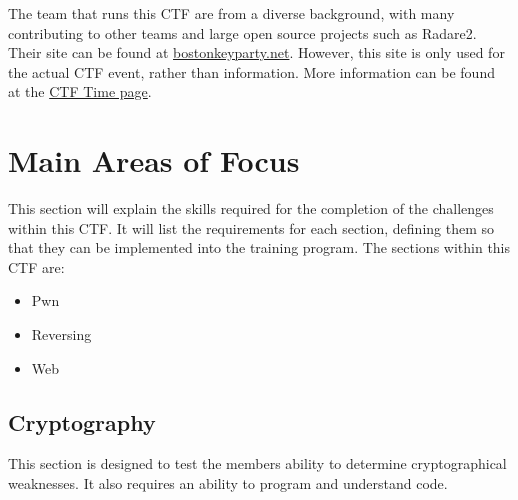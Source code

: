 \documentclass[a4paper,11pt]{report}
\begin{document}
		The team that runs this CTF are from a diverse background, with many contributing to other teams and large open source projects such as Radare2.
		Their site can be found at \href{https://web.archive.org/web/20160131055956/http://bostonkeyparty.net/}{bostonkeyparty.net}. 
		However, this site is only used for the actual CTF event, rather than information. 
		More information can be found at the \href{https://ctftime.org/event/252}{CTF Time page}.
	\section{Main Areas of Focus}
		This section will explain the skills required for the completion of the challenges within this CTF. 
		It will list the requirements for each section, defining them so that they can be implemented into the training program. 
		The sections within this CTF are:
		\begin{itemize}
			\item Pwn
			\item Reversing
			\item Web
		\end{itemize}
		\subsection{Cryptography}
			This section is designed to test the members ability to determine cryptographical weaknesses. 
			It also requires an ability to program and understand code. 
			
\end{document}
